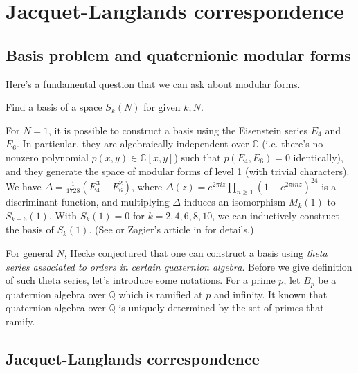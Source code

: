 \newpage
\section{Jacquet-Langlands correspondence}

\subsection{Basis problem and quaternionic modular forms}

Here's a fundamental question that we can ask about modular forms.

\begin{question}
Find a basis of a space $S_{k}(N)$ for given $k, N$.
\end{question}

For $N = 1$, it is possible to construct a basis using the Eisenstein series $E_{4}$ and $E_{6}$.
In particular, they are algebraically independent over $\mathbb{C}$ (i.e. there's no nonzero polynomial $p(x, y) \in \mathbb{C}[x, y]$)
such that $p(E_{4}, E_{6}) = 0$ identically), and they generate the space of modular forms of level 1 (with trivial characters).
We have $\Delta = \frac{1}{1728}(E_{4}^{3} - E_{6}^{2})$, where $\Delta(z) = e^{2\pi i z}\prod_{n\geq 1}(1 - e^{2\pi i n z})^{24}$ is a 
discriminant function, and multiplying $\Delta$ induces an isomorphism $M_{k}(1)$ to $S_{k+6}(1)$.
With $S_{k}(1) = 0$ for $k = 2, 4, 6, 8, 10$, we can inductively construct the basis of $S_{k}(1)$.
(See \cite{serre2012course} or Zagier's article in \cite{bruinier20081} for details.)

For general $N$, Hecke \cite{Hecke1940AnalytischeAD} conjectured that one can construct a basis using \emph{theta series associated to
orders in certain quaternion algebra}.
Before we give definition of such theta series, let's introduce some notations.
For a prime $p$, let $B_{p}$ be a quaternion algebra over $\mathbb{Q}$ which is ramified at $p$ and infinity.
It known that quaternion algebra over $\mathbb{Q}$ is uniquely determined by the set of primes that ramify.

\cite{eichler1973basis}


\subsection{Jacquet-Langlands correspondence}

